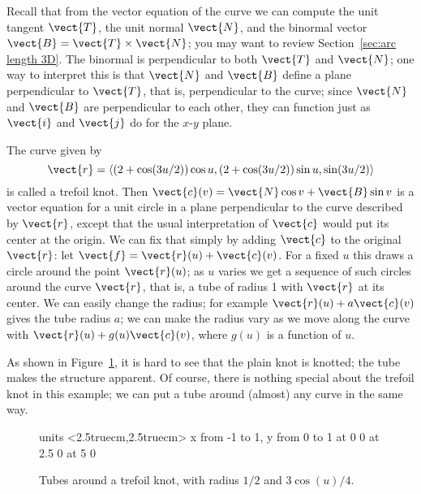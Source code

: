Recall that from the vector equation of the curve we can compute the
unit tangent $\vect{T}$, the unit normal $\vect{N}$, and the 
binormal vector $\vect{B}=\vect{T}\times\vect{N}$; you may
want to review Section~\ref{sec:arc length 3D}. The binormal is
perpendicular to both $\vect{T}$ and $\vect{N}$; one way to interpret this
is that $\vect{N}$ and $\vect{B}$ define a plane perpendicular to $\vect{T}$, that is, perpendicular to the curve; since $\vect{N}$ and $\vect{B}$
are perpendicular to each other, they can function just as $\vect{i}$ and
$\vect{j}$ do for the $x$-$y$ plane.

\begin{example}{}{}
The curve given by 
$$\vect{r}=\langle (2+\cos(3u/2))\cos u,
(2+\cos(3u/2))\sin u, \sin(3u/2)\rangle$$
 is called a trefoil knot.
Then $\vect{c}(v)=\vect{N}\cos v+\vect{B}\sin v$ is a vector equation for a unit circle in a plane
perpendicular to the curve described by $\vect{r}$, except that the usual
interpretation of $\vect{c}$ would put its center at the origin. We can
fix that simply by adding $\vect{c}$ to the original $\vect{r}$:
let $\vect{f}=\vect{r}(u) +\vect{c}(v)$. For a
fixed $u$ this draws a circle around the point $\vect{r}(u)$; as $u$
varies we get a sequence of such circles around the curve $\vect{r}$,
that is, a tube of radius 1 with $\vect{r}$ at its center. We can easily
change the radius; for example $\vect{r}(u) +a\vect{c}(v)$
gives the tube radius $a$; we can make the radius vary as we
move along the curve with $\vect{r}(u) +g(u)\vect{c}(v)$,
where $g(u)$ is a function of $u$. 
\end{example}

As shown in
Figure~\ref{fig:trefoil}, it is hard to see that the plain knot is
knotted; the tube makes the structure apparent. Of course, there is
nothing special about the trefoil knot in this example; we can put a
tube around (almost) any curve in the same way.

\begin{figure}[H]
\centerline{
\vbox{\beginpicture
\normalgraphs
\setcoordinatesystem units <2.5truecm,2.5truecm>
\setplotarea x from -1 to 1, y from 0 to 1
 at 0 0
 at 2.5 0
 at 5 0
\endpicture}}
\caption{Tubes around a trefoil knot, with radius $1/2$ and $3\cos(u)/4$. \label{fig:trefoil}}
\end{figure}

